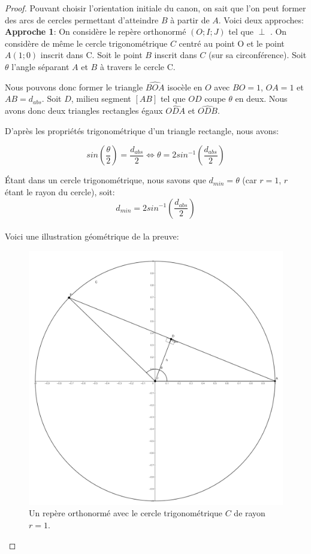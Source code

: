 \documentclass{amsart}
\theoremstyle{definition}
\theoremstyle{remark}
\numberwithin{equation}{section}
\renewcommand*{\overrightarrow}[1]{\vbox{\halign{##\cr 
  \tiny\rightarrowfill\cr\noalign{\nointerlineskip\vskip1pt} 
  $#1\mskip2mu$\cr}}}
\begin{document}
\begin{proof}
  Pouvant choisir l'orientation initiale du canon, on sait que l'on peut former des arcs de cercles permettant d'atteindre $B$ à partir de $A$.
  Voici deux approches:\\

  \textbf{Approche 1}: On considère le repère orthonormé $(O;I;J)$ tel que \overrightarrow{OI} $\perp$ \overrightarrow{OJ}. On considère de même le cercle trigonométrique $C$ centré au point O et le point $A(1;0)$ inscrit dans C. Soit le point
  $B$ inscrit dans $C$ (sur sa circonférence).
  Soit $\theta$ l'angle séparant $A$ et $B$ à travers le cercle C.
  
  Nous pouvons donc former le triangle $\widehat{BOA}$ isocèle en $O$ avec $BO=1$, $OA=1$ et $AB=d_{abs}$. Soit $D$, milieu segment $[AB]$ tel que $OD$ coupe $\theta$ en deux. Nous avons donc deux triangles rectangles égaux $\widehat{ODA}$ et $\widehat{ODB}$.

  D'après les propriétés trigonométrique d'un triangle rectangle, nous avons:

  \[sin(\frac{\theta}{2})=\frac{d_{abs}}{2} \Leftrightarrow \theta = 2sin^{-1}(\frac{d_{abs}}{2})\]

  Étant dans un cercle trigonométrique, nous savons que $d_{min}=\theta$ (car $r=1$, $r$ étant le rayon du cercle), soit: 
  \[d_{min}=2sin^{-1}(\frac{d_{abs}}{2})\] \\

  Voici une illustration géométrique de la preuve:

  \begin{figure}[H]
    \centering
    \includegraphics[scale=0.2]{angle.png}
    \caption{Un repère orthonormé avec le cercle trigonométrique $C$ de rayon $r=1$.}
  \end{figure}


\end{proof}
\end{document}
